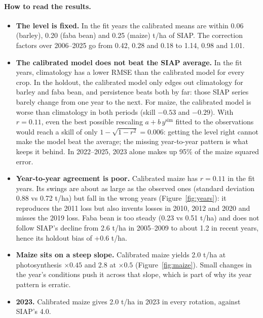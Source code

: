 \documentclass[11pt,a4paper]{article}
\newcommand{\code}[1]{\texttt{\detokenize{#1}}}
\begin{document}
\paragraph{How to read the results.}
\begin{itemize}[leftmargin=*]
  \item \textbf{The level is fixed.} In the fit years the calibrated means are within 0.06 (barley), 0.20 (faba bean)
        and 0.25 (maize) t/ha of SIAP. The \code{farm_gap} correction factors over 2006--2025 go from 0.42, 0.28 and
        0.18 to 1.14, 0.98 and 1.01.
  \item \textbf{The calibrated model does not beat the SIAP average.} In the fit years, climatology has a lower RMSE
        than the calibrated model for every crop. In the holdout, the calibrated model only edges out climatology for
        barley and faba bean, and persistence beats both by far: those SIAP series barely change from one year to the
        next. For maize, the calibrated model is worse than climatology in both periods (skill \(-0.53\) and
        \(-0.29\)). With \(r = 0.11\), even the best possible rescaling \(a + b\,y^{\mathrm{sim}}\) fitted to the
        observations would reach a skill of only \(1 - \sqrt{1 - r^2} = 0.006\): getting the level right cannot make the
        model beat the average; the missing year-to-year pattern is what keeps it behind. In 2022--2025, 2023 alone
        makes up 95\% of the maize squared error.
  \item \textbf{Year-to-year agreement is poor.} Calibrated maize has \(r = 0.11\) in the fit years. Its swings are
        about as large as the observed ones (standard deviation 0.88 vs 0.72 t/ha) but fall in the wrong years
        (Figure~\ref{fig:years}): it reproduces the 2011 loss but also invents losses in 2010, 2012 and 2020 and misses
        the 2019 loss. Faba bean is too steady (0.23 vs 0.51 t/ha) and does not follow SIAP's decline from 2.6 t/ha
        in 2005--2009 to about 1.2 in recent years, hence its holdout bias of +0.6 t/ha.
  \item \textbf{Maize sits on a steep slope.} Calibrated maize yields 2.0 t/ha at photosynthesis \(\times 0.45\) and
        2.8 at \(\times 0.5\) (Figure~\ref{fig:maize}). Small changes in the year's conditions push it across that
        slope, which is part of why its year pattern is erratic.
  \item \textbf{2023.} Calibrated maize gives 2.0 t/ha in 2023 in every rotation, against SIAP's 4.0.
\end{itemize}
\end{document}
